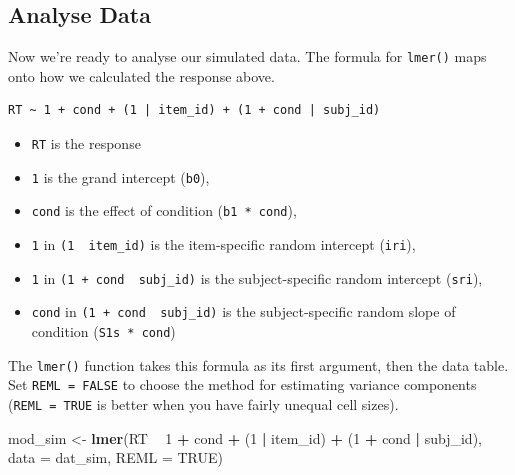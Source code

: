 \documentclass[man,floatsintext]{apa6}
\newenvironment{Shaded}{\begin{snugshade}}{\end{snugshade}}
\newcommand{\KeywordTok}[1]{\textcolor[rgb]{0.13,0.29,0.53}{\textbf{#1}}}
\newcommand{\DataTypeTok}[1]{\textcolor[rgb]{0.13,0.29,0.53}{#1}}
\newcommand{\DecValTok}[1]{\textcolor[rgb]{0.00,0.00,0.81}{#1}}
\newcommand{\StringTok}[1]{\textcolor[rgb]{0.31,0.60,0.02}{#1}}
\newcommand{\OtherTok}[1]{\textcolor[rgb]{0.56,0.35,0.01}{#1}}
\newcommand{\OperatorTok}[1]{\textcolor[rgb]{0.81,0.36,0.00}{\textbf{#1}}}
\newcommand{\NormalTok}[1]{#1}
\providecommand{\tightlist}{%
  \setlength{\itemsep}{0pt}\setlength{\parskip}{0pt}}
\begin{document}
\subsection{Analyse Data}\label{analyse-data}

Now we're ready to analyse our simulated data. The formula for
\texttt{lmer()} maps onto how we calculated the response above.

\begin{verbatim}
RT ~ 1 + cond + (1 | item_id) + (1 + cond | subj_id)
\end{verbatim}

\begin{itemize}
\tightlist
\item
  \texttt{RT} is the response
\item
  \texttt{1} is the grand intercept (\texttt{b0}),
\item
  \texttt{cond} is the effect of condition (\texttt{b1\ *\ cond}),
\item
  \texttt{1} in \texttt{(1\ \textbar{}\ item\_id)} is the item-specific
  random intercept (\texttt{iri}),
\item
  \texttt{1} in \texttt{(1\ +\ cond\ \textbar{}\ subj\_id)} is the
  subject-specific random intercept (\texttt{sri}),
\item
  \texttt{cond} in \texttt{(1\ +\ cond\ \textbar{}\ subj\_id)} is the
  subject-specific random slope of condition (\texttt{S1s\ *\ cond})
\end{itemize}

The \texttt{lmer()} function takes this formula as its first argument,
then the data table. Set \texttt{REML\ =\ FALSE} to choose the method
for estimating variance components (\texttt{REML\ =\ TRUE} is better
when you have fairly unequal cell sizes).

\begin{Shaded}
\begin{Highlighting}[]
\NormalTok{mod_sim <-}\StringTok{ }\KeywordTok{lmer}\NormalTok{(RT }\OperatorTok{~}\StringTok{ }\DecValTok{1} \OperatorTok{+}\StringTok{ }\NormalTok{cond }\OperatorTok{+}\StringTok{ }\NormalTok{(}\DecValTok{1} \OperatorTok{|}\StringTok{ }\NormalTok{item_id) }\OperatorTok{+}\StringTok{ }\NormalTok{(}\DecValTok{1} \OperatorTok{+}\StringTok{ }\NormalTok{cond }\OperatorTok{|}\StringTok{ }\NormalTok{subj_id),}
                \DataTypeTok{data =}\NormalTok{ dat_sim, }\DataTypeTok{REML =} \OtherTok{TRUE}\NormalTok{)}
\end{Highlighting}
\end{Shaded}
\end{document}
